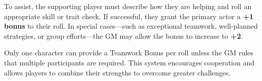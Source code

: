 To assist, the supporting player must describe how they are helping and roll an appropriate skill or trait check. If successful, they grant the primary actor a \textbf{+1 bonus} to their roll. In special cases—such as exceptional teamwork, well-planned strategies, or group efforts—the GM may allow the bonus to increase to \textbf{+2}.  

Only one character can provide a Teamwork Bonus per roll unless the GM rules that multiple participants are required. This system encourages cooperation and allows players to combine their strengths to overcome greater challenges.
